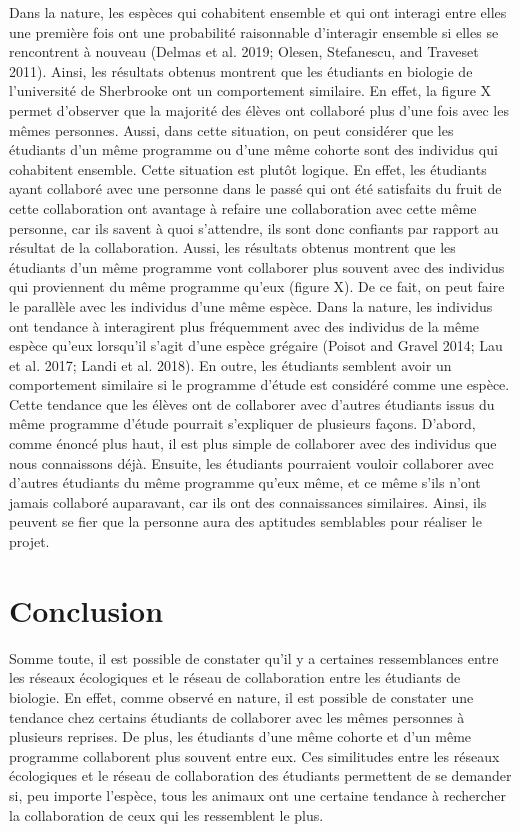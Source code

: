 \documentclass[9pt,twocolumn,twoside,]{pnas-new}
\begin{document}
Dans la nature, les espèces qui cohabitent ensemble et qui ont interagi
entre elles une première fois ont une probabilité raisonnable
d'interagir ensemble si elles se rencontrent à nouveau (Delmas et al.
2019; Olesen, Stefanescu, and Traveset 2011). Ainsi, les résultats
obtenus montrent que les étudiants en biologie de l'université de
Sherbrooke ont un comportement similaire. En effet, la figure X permet
d'observer que la majorité des élèves ont collaboré plus d'une fois avec
les mêmes personnes. Aussi, dans cette situation, on peut considérer que
les étudiants d'un même programme ou d'une même cohorte sont des
individus qui cohabitent ensemble. Cette situation est plutôt logique.
En effet, les étudiants ayant collaboré avec une personne dans le passé
qui ont été satisfaits du fruit de cette collaboration ont avantage à
refaire une collaboration avec cette même personne, car ils savent à
quoi s'attendre, ils sont donc confiants par rapport au résultat de la
collaboration. Aussi, les résultats obtenus montrent que les étudiants
d'un même programme vont collaborer plus souvent avec des individus qui
proviennent du même programme qu'eux (figure X). De ce fait, on peut
faire le parallèle avec les individus d'une même espèce. Dans la nature,
les individus ont tendance à interagirent plus fréquemment avec des
individus de la même espèce qu'eux lorsqu'il s'agit d'une espèce
grégaire (Poisot and Gravel 2014; Lau et al. 2017; Landi et al. 2018).
En outre, les étudiants semblent avoir un comportement similaire si le
programme d'étude est considéré comme une espèce. Cette tendance que les
élèves ont de collaborer avec d'autres étudiants issus du même programme
d'étude pourrait s'expliquer de plusieurs façons. D'abord, comme énoncé
plus haut, il est plus simple de collaborer avec des individus que nous
connaissons déjà. Ensuite, les étudiants pourraient vouloir collaborer
avec d'autres étudiants du même programme qu'eux même, et ce même s'ils
n'ont jamais collaboré auparavant, car ils ont des connaissances
similaires. Ainsi, ils peuvent se fier que la personne aura des
aptitudes semblables pour réaliser le projet.

\hypertarget{conclusion}{%
\section{Conclusion}\label{conclusion}}

Somme toute, il est possible de constater qu'il y a certaines
ressemblances entre les réseaux écologiques et le réseau de
collaboration entre les étudiants de biologie. En effet, comme observé
en nature, il est possible de constater une tendance chez certains
étudiants de collaborer avec les mêmes personnes à plusieurs reprises.
De plus, les étudiants d'une même cohorte et d'un même programme
collaborent plus souvent entre eux. Ces similitudes entre les réseaux
écologiques et le réseau de collaboration des étudiants permettent de se
demander si, peu importe l'espèce, tous les animaux ont une certaine
tendance à rechercher la collaboration de ceux qui les ressemblent le
plus.
\end{document}
